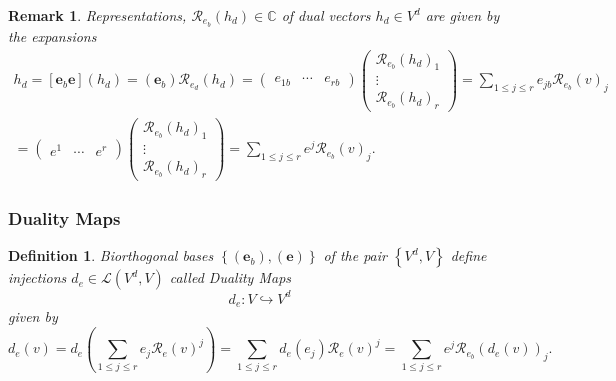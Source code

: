 \documentclass[aps,preprint]{revtex4}
\newtheorem{definition}[theorem]{Definition}
\newtheorem{remark}[theorem]{Remark}
\begin{document}
\begin{remark}
Representations, $\mathcal{R}_{e_{b}}\left( h_{d}\right) \in \mathbb{C}$ of
dual vectors $h_{d}\in V^{d}$ are given by the expansions%
\begin{gather}
h_{d}=\left[ \boldsymbol{e}_{b}\boldsymbol{e}\right] \left( h_{d}\right)
=\left( \boldsymbol{e}_{b}\right) \mathcal{R}_{e_{d}}\left( h_{d}\right)
=\left( 
\begin{array}{ccc}
e_{1b} & \cdots & e_{rb}%
\end{array}%
\right) \left( 
\begin{array}{c}
\mathcal{R}_{e_{b}}\left( h_{d}\right) _{1} \\ 
\vdots \\ 
\mathcal{R}_{e_{b}}\left( h_{d}\right) _{r}%
\end{array}%
\right) =\sum_{1\leq j\leq r}e_{jb}\mathcal{R}_{e_{b}}\left( v\right) _{j} \\
=\left( 
\begin{array}{ccc}
e^{1} & \cdots & e^{r}%
\end{array}%
\right) \left( 
\begin{array}{c}
\mathcal{R}_{e_{b}}\left( h_{d}\right) _{1} \\ 
\vdots \\ 
\mathcal{R}_{e_{b}}\left( h_{d}\right) _{r}%
\end{array}%
\right) =\sum_{1\leq j\leq r}e^{j}\mathcal{R}_{e_{b}}\left( v\right) _{j}.
\end{gather}
\end{remark}

\subsubsection{Duality Maps \label{Duality Maps}}

\begin{definition}
\label{Injections into dual space} Biorthogonal bases $\left\{ \left( 
\boldsymbol{e}_{b}\right) ,\left( \boldsymbol{e}\right) \right\} $ of the
pair $\left\{ V^{d},V\right\} $ define injections $d_{e}\in \mathcal{L}%
\left( V^{d},V\right) $ called Duality Maps 
\begin{equation}
d_{e}:V\hookrightarrow V^{d}
\end{equation}%
given by 
\begin{equation}
d_{e}\left( v\right) =d_{e}\left( \sum_{1\leq j\leq r}e_{j}\mathcal{R}%
_{e}\left( v\right) ^{j}\right) =\sum_{1\leq j\leq r}d_{e}\left(
e_{j}\right) \mathcal{R}_{e}\left( v\right) ^{j}=\sum_{1\leq j\leq r}e^{j}%
\mathcal{R}_{e_{b}}\left( d_{e}\left( v\right) \right) _{j}.
\end{equation}
\end{definition}
\end{document}
